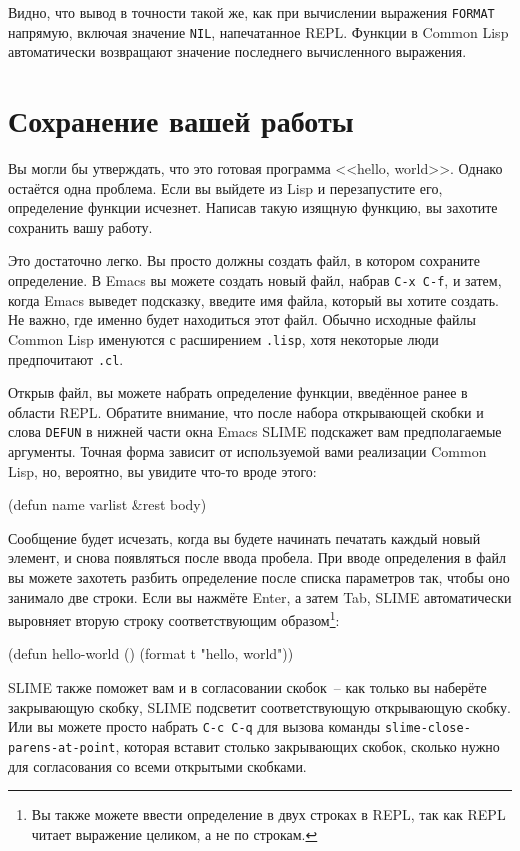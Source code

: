 Видно, что вывод в точности такой же, как при вычислении выражения \lstinline{FORMAT}
напрямую, включая значение \lstinline{NIL}, напечатанное REPL. Функции в Common Lisp автоматически
возвращают значение последнего вычисленного выражения.

\section{Сохранение вашей работы}

Вы могли бы утверждать, что это готовая программа <<hello, world>>. Однако остаётся одна
проблема. Если вы выйдете из Lisp и перезапустите его, определение функции
исчезнет. Написав такую изящную функцию, вы захотите сохранить вашу работу.

Это достаточно легко. Вы просто должны создать файл, в котором сохраните определение. В
Emacs вы можете создать новый файл, набрав \texttt{C-x C-f}, и затем, когда Emacs выведет подсказку,
введите имя файла, который вы хотите создать. Не важно, где именно будет находиться этот
файл. Обычно исходные файлы Common Lisp именуются с расширением \texttt{.lisp}, хотя некоторые люди
предпочитают \texttt{.cl}.

Открыв файл, вы можете набрать определение функции, введённое ранее в области
REPL. Обратите внимание, что после набора открывающей скобки и слова \lstinline{DEFUN} в нижней части
окна Emacs SLIME подскажет вам предполагаемые аргументы. Точная форма зависит от
используемой вами реализации Common Lisp, но, вероятно, вы увидите что-то вроде этого:

\begin{myverb}
(defun name varlist &rest body)
\end{myverb}

Сообщение будет исчезать, когда вы будете начинать печатать каждый новый элемент, и снова
появляться после ввода пробела. При вводе определения в файл вы можете захотеть разбить
определение после списка параметров так, чтобы оно занимало две строки. Если вы нажмёте
Enter, а затем Tab, SLIME автоматически выровняет вторую строку соответствующим
образом\footnote{Вы также можете ввести определение в двух строках в REPL, так как REPL
  читает выражение целиком, а не по строкам.}:

\begin{myverb}
(defun hello-world ()
  (format t "hello, world"))
\end{myverb}

SLIME также поможет вам и в согласовании скобок~-- как только вы наберёте закрывающую
скобку, SLIME подсветит соответствующую открывающую скобку. Или вы можете просто набрать
\texttt{C-c C-q} для вызова команды \texttt{slime-close-parens-at-point}, которая вставит столько
закрывающих скобок, сколько нужно для согласования со всеми открытыми скобками.

